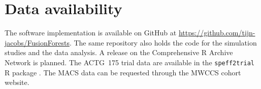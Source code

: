 \section*{Data availability}
\sloppy
The software implementation is available on GitHub at \url{https://github.com/tijn-jacobs/FusionForests}.
The same repository also holds the code for the simulation studies and the data analysis.
A release on the Comprehensive R Archive Network is planned.
The ACTG~175 trial data are available in the \texttt{speff2trial} R package \citep{speff2trial}.
The MACS data can be requested through the MWCCS cohort website.